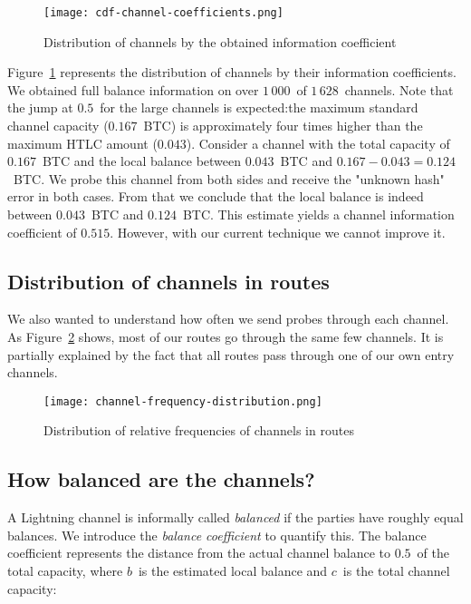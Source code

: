 \begin{figure}[ht]
	\centering
	\texttt{[image: cdf-channel-coefficients.png]}
	\caption{Distribution of channels by the obtained information coefficient}
	\label{fig:cdf-channel-coefficients}
\end{figure}

Figure~\ref{fig:cdf-channel-coefficients} represents the distribution of channels by their information coefficients.
We obtained full balance information on over $1\,000$~of $1\,628$~channels.
Note that the jump at $0.5$~for the large channels is expected:the maximum standard channel capacity ($0.167$~BTC) is approximately four times higher than the maximum HTLC amount ($0.043$).
Consider a channel with the total capacity of $0.167$~BTC and the local balance between $0.043$~BTC and $0.167 - 0.043 = 0.124$~BTC.
We probe this channel from both sides and receive the "unknown hash" error in both cases.
From that we conclude that the local balance is indeed between $0.043$~BTC and $0.124$~BTC.
This estimate yields a channel information coefficient of $0.515$.
However, with our current technique we cannot improve it.

\subsection{Distribution of channels in routes}

We also wanted to understand how often we send probes through each channel.
As Figure~\ref{fig:channel-frequency-distribution} shows, most of our routes go through the same few channels.
It is partially explained by the fact that all routes pass through one of our own entry channels.

\begin{figure}[h]
	\centering
	\texttt{[image: channel-frequency-distribution.png]}
	\caption{Distribution of relative frequencies of channels in routes}
	\label{fig:channel-frequency-distribution}
\end{figure}


\subsection{How balanced are the channels?}

A Lightning channel is informally called \textit{balanced} if the parties have roughly equal balances.
We introduce the \textit{balance coefficient} to quantify this.
The balance coefficient represents the distance from the actual channel balance to $0.5$~of the total capacity, where $b$~is the estimated local balance and $c$~is the total channel capacity:

